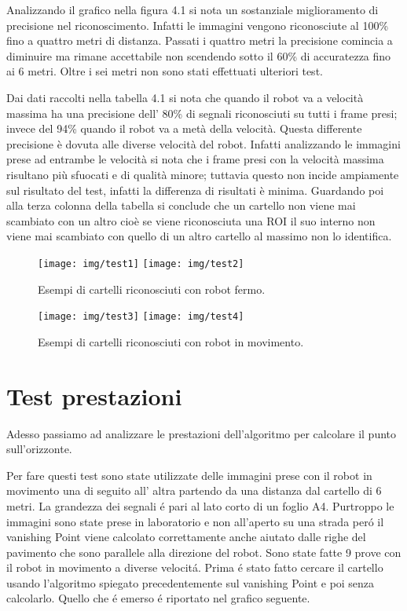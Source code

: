 	Analizzando il grafico nella figura 4.1 si nota un sostanziale miglioramento di precisione nel riconoscimento. Infatti le immagini vengono riconosciute al 100\% fino a quattro metri di distanza. Passati i quattro metri la precisione comincia a diminuire ma rimane accettabile non scendendo sotto il 60\%  di accuratezza fino ai 6 metri. Oltre i sei metri non sono stati effettuati ulteriori test.

	Dai dati raccolti nella tabella 4.1 si nota che quando il robot va a velocità massima ha una precisione dell' 80\% di segnali riconosciuti su tutti i frame presi; invece del 94\% quando il robot va a metà della velocità. Questa differente precisione è dovuta alle diverse velocità del robot. Infatti analizzando le immagini prese ad entrambe le velocità si nota che i frame presi con la velocità massima risultano più sfuocati e di qualità minore; tuttavia questo non incide ampiamente sul risultato del test, infatti la differenza di risultati è minima. Guardando poi alla terza colonna della tabella si conclude che un cartello non viene mai scambiato con un altro cioè se viene riconosciuta una ROI il suo interno non viene mai scambiato con quello di un altro cartello al massimo non lo identifica.

	\begin{figure}[!ht]
		\centering
		\texttt{[image: img/test1]}
		\texttt{[image: img/test2]}
		\caption[Riconosciento immagini robot fermo]{Esempi di cartelli riconosciuti con robot fermo.}
	\end{figure}

	\begin{figure}[!ht]
		\centering
		\texttt{[image: img/test3]}
		\texttt{[image: img/test4]}
		\caption[Riconosciento immagini robot in movimento]{Esempi di cartelli riconosciuti con robot in movimento.}
	\end{figure}

\section{Test prestazioni}

	Adesso passiamo ad analizzare le prestazioni dell'algoritmo per calcolare il punto sull'orizzonte.

	Per fare questi test sono state utilizzate delle immagini prese con il robot in movimento una di seguito all' altra partendo da una distanza dal cartello di 6 metri. La grandezza dei segnali \'e pari al lato corto di un foglio A4. Purtroppo le immagini sono state prese in laboratorio e non all'aperto su una strada per\'o il vanishing Point viene calcolato correttamente anche aiutato dalle righe del pavimento che sono parallele alla direzione del robot. Sono state fatte 9 prove con il robot in movimento a diverse velocit\'a. Prima \'e stato fatto cercare il cartello usando l'algoritmo spiegato precedentemente sul vanishing Point e poi senza calcolarlo. Quello che \'e emerso \'e riportato nel grafico seguente.

